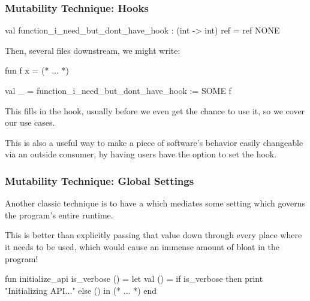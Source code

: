 \documentclass[aspectratio=169, handout]{beamer}
\begin{document}
\begin{frame}[fragile]
  \frametitle{Mutability Technique: Hooks}


  \pause
  \vspace{\fill}

  \begin{codeblock}
    val function_i_need_but_dont_have_hook :
      (int -> int) ref = ref NONE
  \end{codeblock}

  \pause
  \vspace{\fill}

  Then, several files downstream, we might write:
  \begin{codeblock}
    fun f x = (* ... *)

    val _ = function_i_need_but_dont_have_hook := SOME f
  \end{codeblock}

  \pause
  \vspace{\fill}

  This fills in the hook, usually before we even get the chance to use it, so
  we cover our use cases.

  \pause
  \vspace{\fill}

  This is also a useful way to make a piece of software's behavior easily
  changeable via an outside consumer, by having users have the option to
  set the hook.
\end{frame}

\begin{frame}[fragile]
  \frametitle{Mutability Technique: Global Settings}

  Another classic technique is to have a  which mediates some
  setting which governs the program's entire runtime.

  \pause
  \vspace{\fill}

  This is better than explicitly passing that value down through every place where
  it needs to be used, which would cause an immense amount of bloat in the program!

  \pause
  \vspace{\fill}

  \begin{codeblock}
    fun initialize_api is_verbose () =
      let
        val () = if is_verbose then
                   print "Initializing API...\n"
                 else ()
      in
        (* ... *)
      end
  \end{codeblock}
\end{frame}
\end{document}
